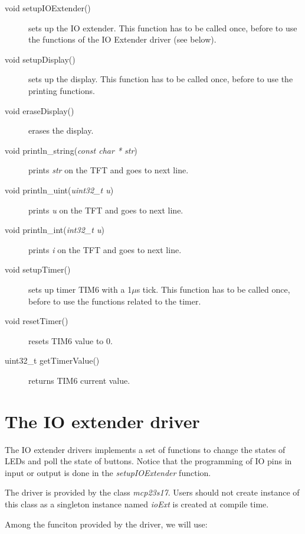 \documentclass[11pt]{report}
\begin{document}
\begin{description}
    \item[void setupIOExtender()] sets up the IO extender. This function has to be called once, before to use the functions of the IO Extender driver (see below).
    \item[void setupDisplay()] sets up the display. This function has to be called once, before to use the printing functions.
    \item[void eraseDisplay()] erases the display.
    \item[void println_string(\textit{const char * str})] prints \textit{str} on the TFT and goes to next line.
    \item[void println_uint(\textit{uint32_t u})] prints \textit{u} on the TFT and goes to next line.
    \item[void println_int(\textit{int32_t u})] prints \textit{i} on the TFT and goes to next line.
    \item[void setupTimer()] sets up timer TIM6 with a 1$\mu$s tick. This function has to be called once, before to use the functions related to the timer.
    \item[void resetTimer()] resets TIM6 value to 0.
    \item[uint32_t getTimerValue()] returns TIM6 current value.
\end{description}


\section{The IO extender driver}

The IO extender drivers implements a set of functions to change the states of LEDs and poll the state of buttons.
Notice that the programming of IO pins in input or output is done in the \textit{setupIOExtender} function.

The driver is provided by the class \textit{mcp23s17}.
Users should not create instance of this class as a singleton instance named \textit{ioExt} is created at compile time.

Among the funciton provided by the driver, we will use:
\end{document}
